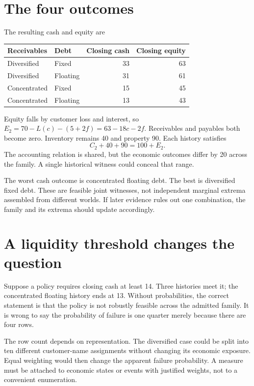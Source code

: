 \section{The four outcomes}
The resulting cash and equity are
\begin{center}
\begin{tabular}{llrr}
\toprule Receivables&Debt&Closing cash&Closing equity\\\midrule
Diversified&Fixed&33&63\\
Diversified&Floating&31&61\\
Concentrated&Fixed&15&45\\
Concentrated&Floating&13&43\\\bottomrule
\end{tabular}
\end{center}
Equity falls by customer loss and interest, so $E_2=70-L(c)-(5+2f)=63-18c-2f$. Receivables and payables both become zero. Inventory remains 40 and property 90. Each history satisfies
\begin{equation}
 C_2+40+90=100+E_2.
\end{equation}
The accounting relation is shared, but the economic outcomes differ by 20 across the family. A single historical witness could conceal that range.

The worst cash outcome is concentrated floating debt. The best is diversified fixed debt. These are feasible joint witnesses, not independent marginal extrema assembled from different worlds. If later evidence rules out one combination, the family and its extrema should update accordingly.

\section{A liquidity threshold changes the question}
Suppose a policy requires closing cash at least 14. Three histories meet it; the concentrated floating history ends at 13. Without probabilities, the correct statement is that the policy is not robustly feasible across the admitted family. It is wrong to say the probability of failure is one quarter merely because there are four rows.

The row count depends on representation. The diversified case could be split into ten different customer-name assignments without changing its economic exposure. Equal weighting would then change the apparent failure probability. A measure must be attached to economic states or events with justified weights, not to a convenient enumeration.

